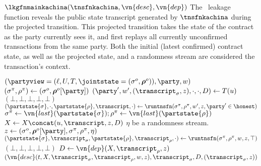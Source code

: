 \begin{leakagefn}{$\lkgfnmainkachina(\tnsfnkachina, \vn{desc}, \vn{dep})$}
  The \kachina\ leakage function reveals the public state transcript generated by
  $\tnsfnkachina$ during the projected transition. This projected transition takes
  the state of the contract as the party currently sees it, and first replays
  all currently unconfirmed transactions from the same party. Both the initial
  (latest confirmed) contract state, as well as the projected state, and a
  randomness stream are considered the transaction's context.

  \vsep

  \begin{receiveinput*}{$(\partyview = (\ell, U, T, \jointstate = (\sigma^o, \boldsymbol\rho^o)), \party, w)$}
    \State \Let $(\sigma^\pi, \rho^\pi) \gets (\sigma^o, \boldsymbol\rho^o[\party])$
      \State \Let $(\party', w', (\transcript_\sigma, z), \cdot, \cdot, D) \gets T(u)$
      \If{$\transcript_\sigma(\sigma^\pi) = \bot$}
        \State \Return $(\bot, \bot, \bot, \bot, \bot)$
      \EndIf
      \State \Let $(\partstate{\sigma}, \cdot, \partstate{\rho}, \transcript, \cdot) \gets
        \runtnsfn(\sigma^\pi, \rho^\pi, w', z, \party' \in \honest)$
      \State \Let $\sigma^\pi \gets \vn{last}(\partstate{\sigma}); \rho^\pi
        \gets \vn{last}(\partstate{\rho})$
      \State \Let $X \gets X \concat (u, \transcript, z, D)$
    \EndFor
    \State \Let $\eta$ be a randomness stream.
    \State \Let $z \gets (\sigma^o, \boldsymbol\rho^o[\party], \sigma^\pi,
      \rho^\pi, \eta)$
    \State \Let $(\partstate{\sigma}, \transcript_\sigma, \partstate{\rho}, \transcript_\rho, \cdot)
      \gets \runtnsfn(\sigma^\pi, \rho^\pi, w, z, \top)$
      \State \Return $(\bot, \bot, \bot, \bot, \bot)$
    \Else
      \State \Let $D \gets \vn{dep}(X, \transcript_\rho, z)$
      \State \Return $(\vn{desc}(t, X, \transcript_\sigma, \transcript_\rho,
        w, z), \transcript_\sigma, D, (\transcript_\sigma, z))$
    \EndIf
  \end{receiveinput*}
\end{leakagefn}
